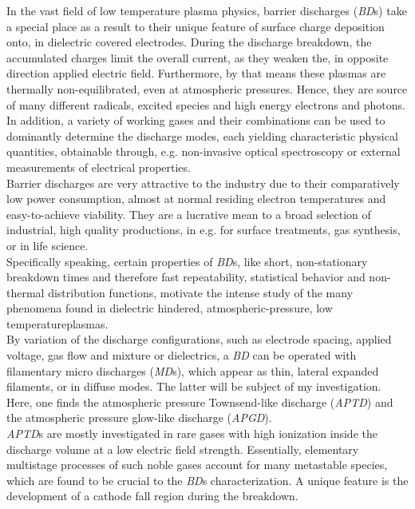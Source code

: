 \documentclass[a4paper,10pt,twoside]{article}
\newcommand{\tilt}[1]{\textit{#1}}
\begin{document}
		In the vast field of low temperature plasma physics, barrier discharges (\tilt{BD}s) take a special place as a result to their unique feature of surface charge deposition onto, in dielectric covered electrodes. During the discharge breakdown, the accumulated charges limit the overall current, as they weaken the, in opposite direction applied electric field. Furthermore, by that means these plasmas are thermally non-equilibrated, even at atmospheric pressures. Hence, they are source of many different radicals, excited species and high energy electrons and photons. In addition, a variety of working gases and their combinations can be used to dominantly determine the discharge modes, each yielding characteristic physical quantities, obtainable through, e.g. non-invasive optical spectroscopy or external measurements of electrical properties.\\ 
		Barrier discharges are very attractive to the industry due to their comparatively low power consumption, almost at normal residing electron temperatures and easy-to-achieve viability. They are a lucrative mean to a broad selection of industrial, high quality productions, in e.g. for surface treatments, gas synthesis, or in life science.\\
		Specifically speaking, certain properties of \tilt{BD}s, like short, non-stationary breakdown times and therefore fast repeatability, statistical behavior and non-thermal distribution functions, motivate the intense study of the many phenomena found in dielectric hindered, atmospheric-pressure, low temperature\linebreak plasmas.\\
		By variation of the discharge configurations, such as electrode spacing, applied voltage, gas flow and mixture or dielectrics, a \tilt{BD} can be operated with filamentary micro discharges (\tilt{MD}s), which appear as thin, lateral expanded filaments, or in diffuse modes. The latter will be subject of my investigation. Here, one finds the atmospheric pressure Townsend-like discharge (\tilt{APTD}) and the atmospheric pressure glow-like discharge (\tilt{APGD}).\\
		\tilt{APTD}s are mostly investigated in rare gases with high ionization inside the discharge volume at a low electric field strength. Essentially, elementary multistage processes of such noble gases account for many metastable species, which are found to be crucial to the \tilt{BD}s characterization. A unique feature is the development of a cathode fall region during the breakdown.\\
\end{document}
